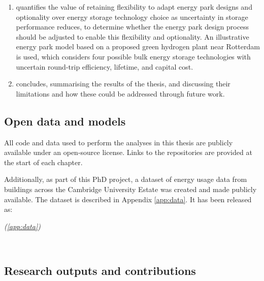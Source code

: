 \begin{enumerate}[wide, labelwidth=!, labelindent=0pt]
    \item[\it\Cref{chap:parks}] quantifies the value of retaining flexibility to adapt energy park designs and optionality over energy storage technology choice as uncertainty in storage performance reduces, to determine whether the energy park design process should be adjusted to enable this flexibility and optionality. An illustrative energy park model based on a proposed green hydrogen plant near Rotterdam is used, which considers four possible bulk energy storage technologies with uncertain round-trip efficiency, lifetime, and capital cost.

    \item[\it\Cref{chap:conclusion}] concludes, summarising the results of the thesis, and discussing their limitations and how these could be addressed through future work.

\end{enumerate}



\ifdefineSpeech
\else

\newpage
\subsection{Open data and models}

All code and data used to perform the analyses in this thesis are publicly available under an open-source license. Links to the repositories are provided at the start of each chapter.

Additionally, as part of this PhD project, a dataset of energy usage data from buildings across the Cambridge University Estate was created and made publicly available. The dataset is described in Appendix \ref{app:data}. It has been released as:

\begin{cbox}[colback=Cerulean!10!white]{}
    \setlength{\parindent}{0pt}%

     \textit{(\ref{app:data})}

\end{cbox}

\hfill \\

\subsection{Research outputs and contributions}

